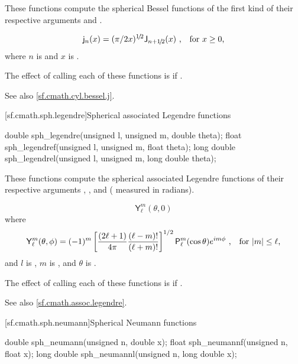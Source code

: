 \begin{itemdescr}
\pnum
\effects
These functions compute
the spherical Bessel functions of the first kind
of their respective arguments
 and .

\pnum
\returns
\[ \mathsf{j}_n(x) = (\pi/2x)^{1\!/\!2} \mathsf{J}_{n + 1\!/\!2}(x) \text{ ,\quad for $x \ge 0$,} \]
where
$n$ is  and
$x$ is .

\pnum\remarks
The effect of calling each of these functions
is 
if .

\pnum See also \ref{sf.cmath.cyl.bessel.j}.
\end{itemdescr}

[sf.cmath.sph.legendre]{Spherical associated Legendre functions}%
%
%
%
%
%
%
\begin{itemdecl}
double       sph_legendre(unsigned l, unsigned m, double theta);
float        sph_legendref(unsigned l, unsigned m, float theta);
long double  sph_legendrel(unsigned l, unsigned m, long double theta);
\end{itemdecl}

\begin{itemdescr}
\pnum
\effects
These functions compute the spherical associated Legendre functions
of their respective arguments
, , and  ( measured in radians).

\pnum
\returns
\[ \mathsf{Y}_\ell^m(\theta, 0) \]
where
\[ \mathsf{Y}_\ell^m(\theta, \phi) =
     (-1)^m \left[\frac{(2 \ell + 1)}{4 \pi} \frac{(\ell - m)!}{(\ell + m)!}\right]^{1/2}
     \mathsf{P}_\ell^m (\cos\theta) e^{i m \phi}
     \text{ ,\quad for $|m| \le \ell$,}
\]
and
$l$ is ,
$m$ is , and
$\theta$ is .

\pnum
\remarks
The effect of calling each of these functions
is 
if .

\pnum
See also \ref{sf.cmath.assoc.legendre}.
\end{itemdescr}

[sf.cmath.sph.neumann]{Spherical Neumann functions}%
%
%
%
%
%
%
\begin{itemdecl}
double       sph_neumann(unsigned n, double x);
float        sph_neumannf(unsigned n, float x);
long double  sph_neumannl(unsigned n, long double x);
\end{itemdecl}


